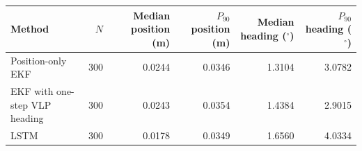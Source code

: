 \begin{tabular}{lrrrrr}
\toprule
Method & $N$ & Median position (m) & $P_{90}$ position (m) & Median heading ($^\circ$) & $P_{90}$ heading ($^\circ$) \\
\midrule
Position-only EKF & 300 & 0.0244 & 0.0346 & 1.3104 & 3.0782 \\
EKF with one-step VLP heading & 300 & 0.0243 & 0.0354 & 1.4384 & 2.9015 \\
LSTM & 300 & 0.0178 & 0.0349 & 1.6560 & 4.0334 \\
\bottomrule
\end{tabular}
